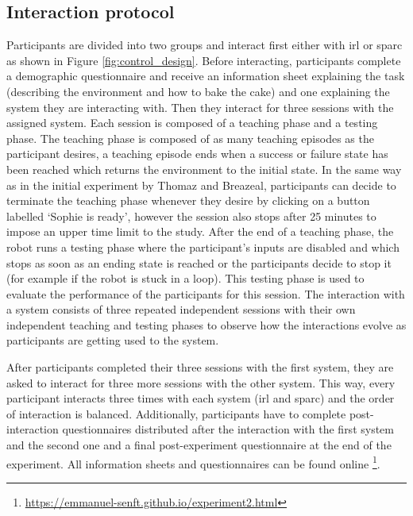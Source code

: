 \subsection{Interaction protocol}

Participants are divided into two groups and interact first either with \gls{irl} or \gls{sparc} as shown in Figure \ref{fig:control_design}. Before interacting, participants complete a demographic questionnaire and receive an information sheet explaining the task (describing the environment and how to bake the cake) and one explaining the system they are interacting with. Then they interact for three sessions with the assigned system. Each session is composed of a teaching phase and a testing phase. The teaching phase is composed of as many teaching episodes as the participant desires, a teaching episode ends when a success or failure state has been reached which returns the environment to the initial state. In the same way as in the initial experiment by Thomaz and Breazeal, participants can decide to terminate the teaching phase whenever they desire by clicking on a button labelled `Sophie is ready', however the session also stops after 25 minutes to impose an upper time limit to the study. After the end of a teaching phase, the robot runs a testing phase where the participant's inputs are disabled and which stops as soon as an ending state is reached or the participants decide to stop it (for example if the robot is stuck in a loop). This testing phase is used to evaluate the performance of the participants for this session. The interaction with a system consists of three repeated independent sessions with their own independent teaching and testing phases to observe how the interactions evolve as participants are getting used to the system.

After participants completed their three sessions with the first system, they are asked to interact for three more sessions with the other system. This way, every participant interacts three times with each system (\gls{irl} and \gls{sparc}) and the order of interaction is balanced. Additionally, participants have to complete post-interaction questionnaires distributed after the interaction with the first system and the second one and a final post-experiment questionnaire at the end of the experiment. All information sheets and questionnaires can be found online \footnote{\url{https://emmanuel-senft.github.io/experiment2.html}}.

